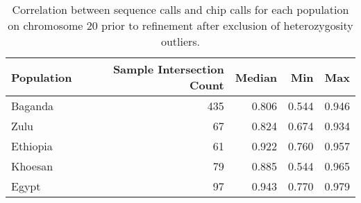 \begin{table}[htbp]
\centering
\begin{tabular}{l|r|r|r|r}
\hline
Population & Sample Intersection Count & Median & Min & Max \\
\hline
Baganda & 435 & 0.806 & 0.544 & 0.946 \\
Zulu & 67 & 0.824 & 0.674 & 0.934 \\
Ethiopia & 61 & 0.922 & 0.760 & 0.957 \\
Khoesan & 79 & 0.885 & 0.544 & 0.965 \\
Egypt & 97 & 0.943 & 0.770 & 0.979 \\
\hline
\end{tabular}
\caption{Correlation between sequence calls and chip calls for each population on chromosome 20 prior to refinement after exclusion of heterozygosity outliers.}
\label{tab:correlation_prerefinement}
\end{table}